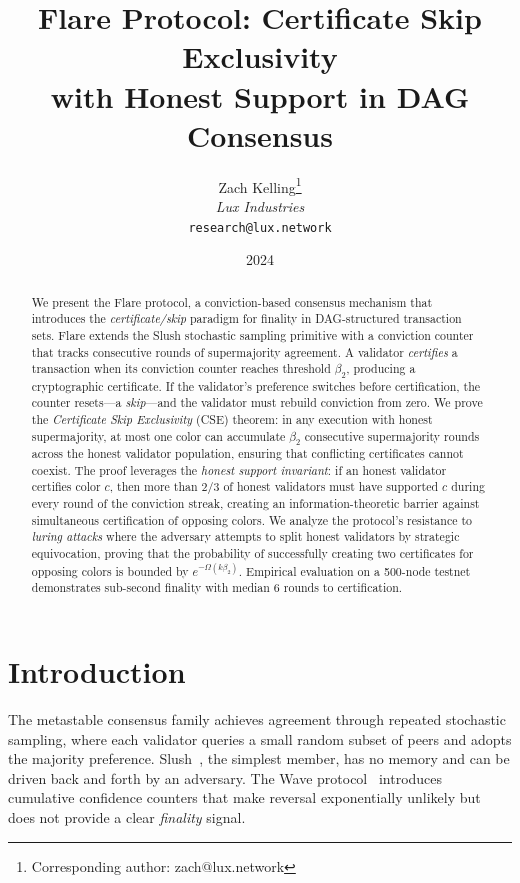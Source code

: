 \documentclass[11pt,a4paper]{article}
\title{\textbf{Flare Protocol: Certificate Skip Exclusivity\\with Honest Support in DAG Consensus}}
\author{
Zach Kelling\thanks{Corresponding author: zach@lux.network}\\
\textit{Lux Industries}\\
\texttt{research@lux.network}
}
\date{2024}
\begin{document}
\luxcoverpage
\maketitle

\begin{abstract}
We present the Flare protocol, a conviction-based consensus mechanism that introduces
the \emph{certificate/skip} paradigm for finality in DAG-structured transaction sets.
Flare extends the Slush stochastic sampling primitive with a conviction counter that
tracks consecutive rounds of supermajority agreement. A validator \emph{certifies} a
transaction when its conviction counter reaches threshold $\beta_2$, producing a
cryptographic certificate. If the validator's preference switches before certification,
the counter resets---a \emph{skip}---and the validator must rebuild conviction from zero.
We prove the \emph{Certificate Skip Exclusivity} (CSE) theorem: in any execution
with honest supermajority, at most one color can accumulate $\beta_2$ consecutive
supermajority rounds across the honest validator population, ensuring that conflicting
certificates cannot coexist. The proof leverages the \emph{honest support invariant}:
if an honest validator certifies color $c$, then more than $2/3$ of honest validators
must have supported $c$ during every round of the conviction streak, creating an
information-theoretic barrier against simultaneous certification of opposing colors.
We analyze the protocol's resistance to \emph{luring attacks} where the adversary
attempts to split honest validators by strategic equivocation, proving that the
probability of successfully creating two certificates for opposing colors is bounded by
$e^{-\Omega(k\beta_2)}$. Empirical evaluation on a 500-node testnet demonstrates
sub-second finality with median 6 rounds to certification.
\end{abstract}

\tableofcontents
\newpage

\section{Introduction}
\label{sec:introduction}

The metastable consensus family achieves agreement through repeated stochastic sampling,
where each validator queries a small random subset of peers and adopts the majority
preference. Slush~\cite{rocket2019snowflake}, the simplest member, has no memory
and can be driven back and forth by an adversary. The Wave protocol~\cite{kelling2020wave}
introduces cumulative confidence counters that make reversal exponentially unlikely
but does not provide a clear \emph{finality} signal.
\end{document}
